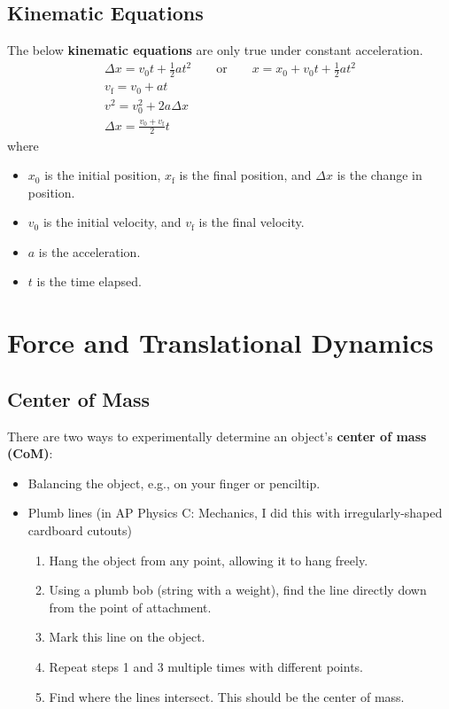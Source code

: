 \documentclass[a4paper, titlepage]{book}
\begin{document}
\section{Kinematic Equations}

The below \textbf{kinematic equations} are only true under constant acceleration.
\begin{gather} \label{eq:linear-kinematic}
    {
        \Delta{x} = v_0 t + \frac{1}{2} a t^2
        \qquad \mathrm{or} \qquad
        x = x_0 + v_0 t + \frac{1}{2} a t^2
    } \\
    v_\mathrm{f} = v_0 + a t \\
    v^2 = v_0^2 + 2 a \Delta{x} \\
    \Delta{x} = \frac{v_0 + v_\mathrm{f}}{2} t
\end{gather}
where
\begin{itemize}
    \item
        \(x_0\) is the initial position,
        \(x_\mathrm{f}\) is the final position,
        and \(\Delta{x}\) is the change in position.
    \item
        \(v_0\) is the initial velocity,
        and \(v_\mathrm{f}\) is the final velocity.
    \item \(a\) is the acceleration.
    \item \(t\) is the time elapsed.
\end{itemize}


\chapter{Force and Translational Dynamics}

\section{Center of Mass}

There are two ways to experimentally determine an object's \textbf{center of mass (CoM)}:
\begin{itemize}
    \item Balancing the object, e.g., on your finger or penciltip.
    \item
        Plumb lines (in AP Physics C: Mechanics, I did this with irregularly-shaped cardboard cutouts)
        \begin{enumerate}
            \item Hang the object from any point, allowing it to hang freely.
            \item
                Using a plumb bob (string with a weight),
                find the line directly down from the point of attachment.
            \item Mark this line on the object.
            \item Repeat steps 1 and 3 multiple times with different points.
            \item
                Find where the lines intersect.
                This should be the center of mass.
        \end{enumerate}
\end{itemize}
\end{document}
